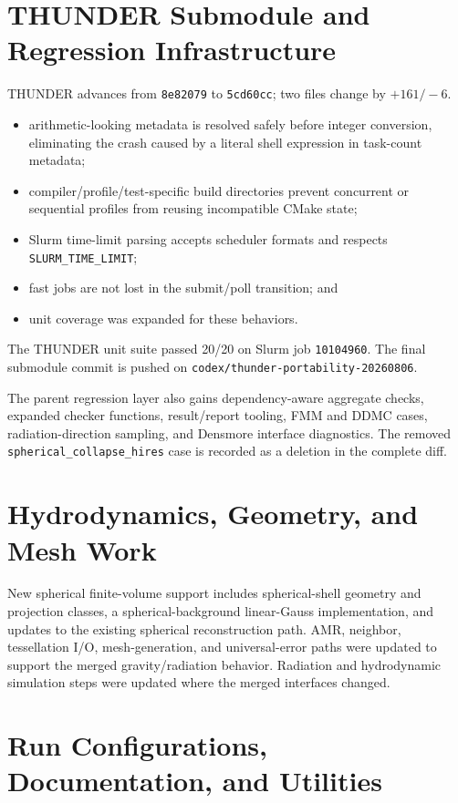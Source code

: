 \documentclass[10pt,a4paper]{article}
\newcommand{\commit}[1]{\texttt{#1}}
\newcommand{\file}[1]{\nolinkurl{#1}}
\begin{document}
\section{THUNDER Submodule and Regression Infrastructure}

THUNDER advances from \commit{8e82079} to \commit{5cd60cc}; two files change
by $+161/-6$.
\begin{itemize}
  \item arithmetic-looking metadata is resolved safely before integer
        conversion, eliminating the crash caused by a literal shell expression
        in task-count metadata;
  \item compiler/profile/test-specific build directories prevent concurrent or
        sequential profiles from reusing incompatible CMake state;
  \item Slurm time-limit parsing accepts scheduler formats and respects
        \file{SLURM_TIME_LIMIT};
  \item fast jobs are not lost in the submit/poll transition; and
  \item unit coverage was expanded for these behaviors.
\end{itemize}

The THUNDER unit suite passed 20/20 on Slurm job \commit{10104960}.  The final
submodule commit is pushed on
\file{codex/thunder-portability-20260806}.

The parent regression layer also gains dependency-aware aggregate checks,
expanded checker functions, result/report tooling, FMM and DDMC cases,
radiation-direction sampling, and Densmore interface diagnostics.  The removed
\file{spherical_collapse_hires} case is recorded as a deletion in the complete
diff.

\section{Hydrodynamics, Geometry, and Mesh Work}

New spherical finite-volume support includes spherical-shell geometry and
projection classes, a spherical-background linear-Gauss implementation, and
updates to the existing spherical reconstruction path.  AMR, neighbor,
tessellation I/O, mesh-generation, and universal-error paths were updated to
support the merged gravity/radiation behavior.  Radiation and hydrodynamic
simulation steps were updated where the merged interfaces changed.

\section{Run Configurations, Documentation, and Utilities}
\end{document}
